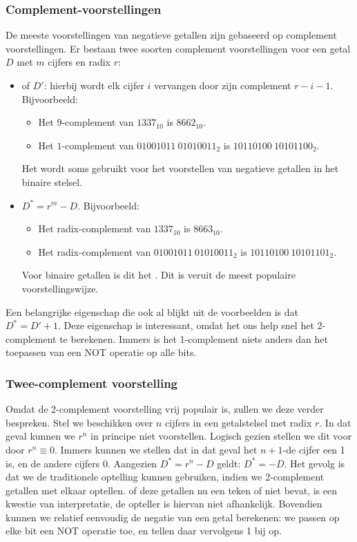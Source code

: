 \subsubsection{Complement-voorstellingen}
De meeste voorstellingen van negatieve getallen zijn gebaseerd op complement voorstellingen. Er bestaan twee soorten complement voorstellingen voor een getal $D$ met $m$ cijfers en radix $r$:
\begin{itemize}
 \item {} of  $D'$: hierbij wordt elk cijfer $i$ vervangen door zijn complement $r-i-1$. Bijvoorbeeld:
 \begin{itemize}
    \item Het $9$-complement van $1337_{10}$ is $8662_{10}$.
    \item Het $1$-complement van $01001011\ 01010011_2$ is $10110100\ 10101100_2$.
 \end{itemize}
 Het  wordt soms gebruikt voor het voorstellen van negatieve getallen in het binaire stelsel.
 \item {} $D^*=r^m-D$. Bijvoorbeeld:
 \begin{itemize}
    \item Het radix-complement van $1337_{10}$ is $8663_{10}$.
    \item Het radix-complement van $01001011\ 01010011_2$ is $10110100\ 10101101_2$.
 \end{itemize}
 Voor binaire getallen is dit het . Dit is veruit de meest populaire voorstellingswijze.
\end{itemize}
Een belangrijke eigenschap die ook al blijkt uit de voorbeelden is dat $D^*=D'+1$. Deze eigenschap is interessant, omdat het ons help snel het 2-complement te berekenen. Immers is het 1-complement niets anders dan het toepassen van een NOT operatie op alle bits.
\subsubsection{Twee-complement voorstelling}
Omdat de 2-complement voorstelling vrij populair is, zullen we deze verder bespreken. Stel we beschikken over $n$ cijfers in een getalstelsel met radix $r$. In dat geval kunnen we $r^n$ in principe niet voorstellen. Logisch gezien stellen we dit voor door $r^n\equiv 0$. Immers kunnen we stellen dat in dat geval het $n+1$-de cijfer een 1 is, en de andere cijfers 0. Aangezien $D^*=r^n-D$ geldt: $D^*=-D$. Het gevolg is dat we de traditionele optelling kunnen gebruiken, indien we 2-complement getallen met elkaar optellen. of deze getallen nu een teken of niet bevat, is een kwestie van interpretatie, de opteller is hiervan niet afhankelijk. Bovendien kunnen we relatief eenvoudig de negatie van een getal berekenen: we passen op elke bit een NOT operatie toe, en tellen daar vervolgens 1 bij op.
